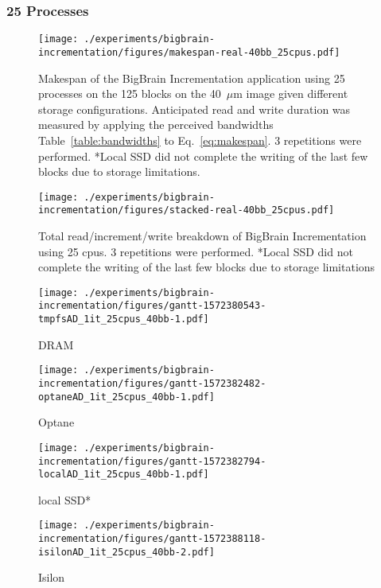 \documentclass[conference]{IEEEtran}
\newcommand{\bigbrain}{BigBrain\xspace}
\begin{document}
\subsubsection{25 Processes}
\begin{figure}
    \texttt{[image: ./experiments/bigbrain-incrementation/figures/makespan-real-40bb\_25cpus.pdf]}
    \captionsetup{belowskip=-10pt}
    \caption{Makespan of the \bigbrain Incrementation application using 25 
             processes on the 125 blocks on the 40~$\mu$m image given different
             storage configurations. Anticipated read and write duration was 
             measured by applying the perceived bandwidths Table~\ref{table:bandwidths}
             to Eq.~\ref{eq:makespan}. 3 
             repetitions were performed. *Local SSD did not complete the
    writing of the last few blocks due to storage limitations.}\label{fig:makespan-25cpus}
\end{figure}
\begin{figure}
    \texttt{[image: ./experiments/bigbrain-incrementation/figures/stacked-real-40bb\_25cpus.pdf]}
    \captionsetup{belowskip=0pt}
    \caption{Total read/increment/write breakdown of \bigbrain Incrementation using 25 cpus. 3 repetitions were performed. *Local SSD did not
             complete the writing of the last few blocks due to storage limitations}\label{fig:stacked-25cpus}
\end{figure}
\begin{figure*}
    \begin{subfigure}{\columnwidth}
        \centering
    \texttt{[image: ./experiments/bigbrain-incrementation/figures/gantt-1572380543-tmpfsAD\_1it\_25cpus\_40bb-1.pdf]}
    \caption{DRAM}
\end{subfigure}
\begin{subfigure}{\columnwidth}
        \centering
    \texttt{[image: ./experiments/bigbrain-incrementation/figures/gantt-1572382482-optaneAD\_1it\_25cpus\_40bb-1.pdf]}
    \caption{Optane}
\end{subfigure}
\begin{subfigure}{\columnwidth}
        \centering
    \texttt{[image: ./experiments/bigbrain-incrementation/figures/gantt-1572382794-localAD\_1it\_25cpus\_40bb-1.pdf]}
    \caption{local SSD*}
\end{subfigure}
\begin{subfigure}{\columnwidth}
        \centering
    \texttt{[image: ./experiments/bigbrain-incrementation/figures/gantt-1572388118-isilonAD\_1it\_25cpus\_40bb-2.pdf]}
    \caption{Isilon}\label{fig:gantt25isilon}
\end{subfigure}
    \captionsetup{belowskip=-10pt}
\caption{Gantt charts for each storage device (App Direct Mode) processing 125 blocks of the 40$\mu$m BigBrain using 25 processes. *Some local SSD writes did not complete due to storage limitations.}\label{fig:gantt25}
\end{figure*}
\end{document}
